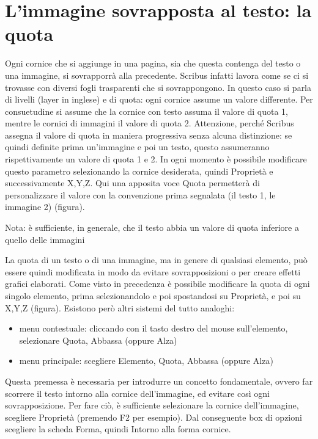 \documentclass[a4paper, 12pt]{book}
\begin{document}
\section{L'immagine sovrapposta al testo: la quota}
Ogni cornice che si aggiunge in una pagina, sia che questa contenga del testo o una immagine, si sovrapporrà alla precedente. Scribus infatti lavora come se ci si trovasse con diversi fogli trasparenti che si sovrappongono. In questo caso si parla di livelli (layer in inglese) e di quota: ogni cornice assume un valore differente. Per consuetudine si assume che la cornice con testo assuma il valore di quota 1, mentre le cornici di immagini il valore di quota 2. Attenzione, perché Scribus assegna il valore di quota in maniera progressiva senza alcuna distinzione: se quindi definite prima un'immagine e poi un testo, questo assumeranno rispettivamente un valore di quota 1 e 2. In ogni momento è possibile modificare questo parametro selezionando la cornice desiderata, quindi Proprietà e successivamente X,Y,Z. Qui una apposita voce Quota permetterà di personalizzare il valore con la convenzione prima segnalata (il testo 1, le immagine 2) (figura).

Nota: è sufficiente, in generale, che il testo abbia un valore di quota inferiore a quello delle immagini

La quota di un testo o di una immagine, ma in genere di qualsiasi elemento, può essere quindi modificata in modo da evitare sovrapposizioni o per creare effetti grafici elaborati. Come visto in precedenza è possibile modificare la quota di ogni singolo elemento, prima selezionandolo e poi spostandosi su Proprietà, e poi su X,Y,Z (figura). Esistono però altri sistemi del tutto analoghi:

\begin{itemize}
	\item menu contestuale: cliccando con il tasto destro del mouse sull'elemento, selezionare Quota, Abbassa (oppure Alza)

	\item menu principale: scegliere Elemento, Quota, Abbassa (oppure Alza)
\end{itemize}

Questa premessa è necessaria per introdurre un concetto fondamentale, ovvero far scorrere il testo intorno alla cornice dell'immagine, ed evitare così ogni sovrapposizione. Per fare ciò, è sufficiente selezionare la cornice dell'immagine, scegliere Proprietà (premendo F2 per esempio). Dal conseguente box di opzioni scegliere la scheda Forma, quindi Intorno alla forma cornice.
\end{document}
